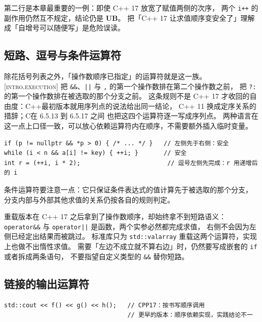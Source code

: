 \documentclass[12pt,a4paper,fontset=fandol]{ctexbook}
\newcommand{\Tp}[1]{\texttt{#1}}
\newcommand{\Lang}[1]{\textsf{#1}}
\newcommand{\CL}{\Lang{C}}
\newcommand{\CPP}{\Lang{C++}}
\newcommand{\UB}{\textbf{\textsf{UB}}}
\newcommand{\Std}[1]{\textsc{[#1]}}
\newcommand{\Clause}[1]{\textsc{\small #1}}
\begin{document}
第二行是本章最重要的一例：即使 \CPP{} 17 放宽了赋值两侧的次序，
两个 \Tp{i++} 的副作用仍然互不规定，结论仍是 \UB{}。
把「\CPP{} 17 让求值顺序变安全了」理解成「自增号可以随便写」是危险误读。

\subsection{短路、逗号与条件运算符}\label{sec:ub08-shortcircuit}

除花括号列表之外，「操作数顺序已指定」的运算符就是这一族。
\Std{intro.execution} 把 \Tp{\&\&}、\Tp{||} 与 \Tp{,} 的第一个操作数排在第二个操作数之前，
把 \Tp{?:} 的第一个操作数排在被选取的那个分支之前。
这条规则不是 \CPP{} 17 才收回的自由度：\CPP 最初版本就用序列点的说法给出同一结论，
\CPP{} 11 换成定序关系的措辞；\CL 在 \Clause{6.5.13} 到 \Clause{6.5.17} 之间
也把这四个运算符逐一写成序列点。
两种语言在这一点上口径一致，可以放心依赖运算符内在顺序，不需要额外插入临时变量。

\begin{lstlisting}[style=cppstyle,caption={有强制顺序的构造}]
if (p != nullptr && *p > 0) { /* ... */ }   // 左侧先于右侧：安全
while (i < n && a[i] != key) { ++i; }       // 安全
int r = (++i, i * 2);                        // 逗号左侧先完成：r 用递增后的 i
\end{lstlisting}

条件运算符要注意一点：它只保证条件表达式的值计算先于被选取的那个分支，
分支内部与外部其他求值的关系仍按各自的规则判定。

\begin{warning}[title={顺序已指定与短路求值是两件事}]
重载版本在 \CPP{} 17 之后拿到了操作数顺序，却始终拿不到短路语义：
\Tp{operator\&\&} 与 \Tp{operator||} 是函数，两个实参必然都完成求值，
右侧不会因为左侧已经定出结果而被跳过。
标准库只为 \Tp{std::valarray} 重载这两个运算符，实现上也做不出惰性求值。
需要「左边不成立就不算右边」时，仍然要写成嵌套的 \Tp{if} 或者拆成两条语句，
不要指望自定义类型的 \Tp{\&\&} 替你短路。
\end{warning}

\subsection{链接的输出运算符}\label{sec:ub08-chain}

\begin{lstlisting}[style=cppstyle,caption={流输出的链接顺序}]
std::cout << f() << g() << h();   // CPP17：按书写顺序调用
                                  // 更早的版本：顺序依赖实现，实践结论不一
\end{lstlisting}
\end{document}

